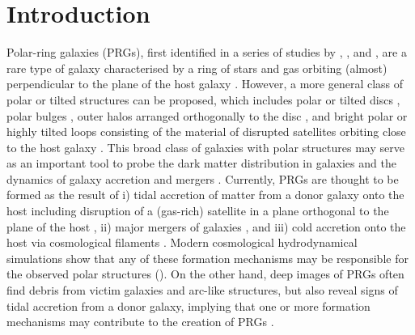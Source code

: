 \documentclass[letter]{aa}
\begin{document}
%

\section{Introduction} 
\label{sec:intro}

Polar-ring galaxies (PRGs), first identified in a series of studies by \citet{1978AJ.....83.1360S}, \citet{1978ApJ...226L.115B}, and \citet{1983AJ.....88..909S}, are a rare type of galaxy characterised by a ring of stars and gas orbiting (almost) perpendicular to the plane of the host galaxy \citep[see also][]{1990AJ....100.1489W,1997A&A...325..933R,2011MNRAS.418..244M}. However, a more general class of polar or tilted structures can be proposed, which includes polar or tilted discs \citep{1999ApJ...519L.127B,2020MNRAS.497.2039M}, polar bulges \citep{2012MNRAS.423L..79C,2015AstL...41..748R}, outer halos arranged orthogonally to the disc \citep{2016ApJ...823...19C,2020MNRAS.494.1751M,2021MNRAS.506.5030M}, and bright polar or highly tilted loops consisting of the material of disrupted satellites orbiting close to the host galaxy \citep{2010AJ....140..962M,2019A&A...632L..13M,2023A&A...671A.141M}. This broad class of galaxies with polar structures may serve as an important tool to probe the dark matter distribution in galaxies \citep{1987ApJ...314..439W,1994ApJ...436..629S,1996A&A...305..763C,2003ApJ...585..730I,2011MNRAS.418..244M,2012MNRAS.425.1967S,2014MNRAS.441.2650K,2015BaltA..24...76M} and the dynamics of galaxy accretion \citep{2008ApJ...689..678B} and mergers \citep{1998ApJ...499..635B,2003A&A...401..817B}. Currently, PRGs are thought to be formed as the result of i) tidal accretion of matter from a donor galaxy onto the host \citep[][]{schweizer1983colliding,1997A&A...325..933R} including disruption of a (gas-rich) satellite in a plane orthogonal to the plane of the host \citep{1991wdir.conf..112R,1992ApJ...389L..55K}, ii) major mergers of galaxies \citep[][]{bekki1997formation,bekki1998formation,2003A&A...401..817B}, and iii) cold accretion onto the host via cosmological filaments \citep{2006ApJ...636L..25M,2008ApJ...689..678B}. Modern cosmological hydrodynamical simulations show that any of these formation mechanisms may be responsible for the observed polar structures (\citealt{2019MNRAS.485..464L,2021MNRAS.504.5702W,2023arXiv231018597S}). On the other hand, deep images of PRGs often find debris from victim galaxies and arc-like structures, but also reveal signs of tidal accretion from a donor galaxy, implying that one or more formation mechanisms may contribute to the creation of PRGs \citep[][]{2011MNRAS.412..208F,2012MNRAS.422.2386F,mosenkov2022unveiling}.
\end{document}

